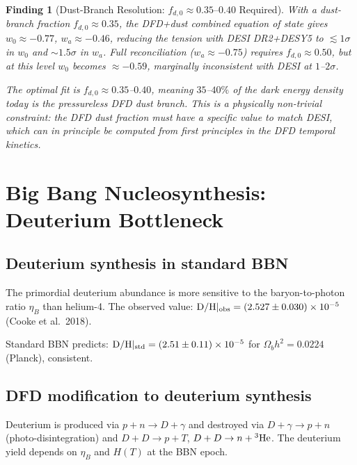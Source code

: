 \documentclass[11pt]{article}
\newtheorem{finding}{Finding}
\newcommand{\ee}[1]{\times 10^{#1}}
\begin{document}
\begin{finding}[Dust-Branch Resolution: $f_{d,0} \approx 0.35$--$0.40$ Required]
\label{find:dust-branch}
With a dust-branch fraction $f_{d,0} \approx 0.35$, the DFD+dust
combined equation of state gives $w_0 \approx -0.77$, $w_a \approx -0.46$,
reducing the tension with DESI DR2+DESY5 to $\lesssim 1\sigma$ in $w_0$
and $\sim 1.5\sigma$ in $w_a$.  Full reconciliation ($w_a \approx -0.75$)
requires $f_{d,0} \approx 0.50$, but at this level $w_0$ becomes
$\approx -0.59$, marginally inconsistent with DESI at $1$--$2\sigma$.

The optimal fit is $f_{d,0} \approx 0.35$--$0.40$, meaning
$35$--$40\%$ of the dark energy density today is the pressureless DFD
dust branch.  This is a physically non-trivial constraint: the DFD
dust fraction must have a specific value to match DESI, which can in
principle be computed from first principles in the DFD temporal kinetics.
\end{finding}

\section{Big Bang Nucleosynthesis: Deuterium Bottleneck}
\label{sec:bbn-deuterium}

\subsection{Deuterium synthesis in standard BBN}

The primordial deuterium abundance is more sensitive to the baryon-to-photon
ratio $\eta_B$ than helium-4.  The observed value:
$\text{D/H}|_{\rm obs} = (2.527 \pm 0.030)\ee{-5}$ (Cooke et al.\ 2018).

Standard BBN predicts: $\text{D/H}|_{\rm std} = (2.51 \pm 0.11)\ee{-5}$
for $\Omega_b h^2 = 0.0224$ (Planck), consistent.

\subsection{DFD modification to deuterium synthesis}

Deuterium is produced via $p + n \to D + \gamma$ and destroyed via
$D + \gamma \to p + n$ (photo-disintegration) and $D + D \to p + T$,
$D + D \to n + {}^3{\rm He}$.  The deuterium yield depends on $\eta_B$
and $H(T)$ at the BBN epoch.
\end{document}
